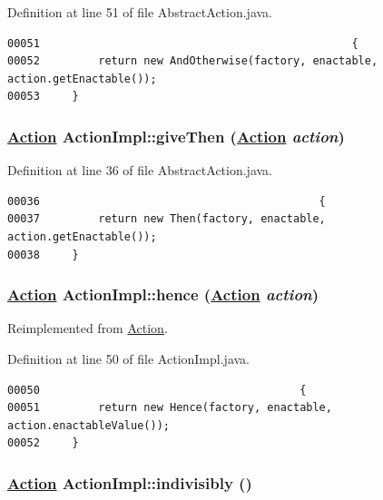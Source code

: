 Definition at line 51 of file Abstract\-Action.java.\footnotesize\begin{verbatim}00051                                                {
00052         return new AndOtherwise(factory, enactable, action.getEnactable());
00053     }
\end{verbatim}\normalsize 
\hypertarget{classActionImpl_a2}{
\subsubsection[giveThen]{\setlength{\rightskip}{0pt plus 5cm}\hyperlink{interfaceAction}{Action} Action\-Impl::give\-Then (\hyperlink{interfaceAction}{Action} {\em action})}}
\label{classActionImpl_a2}




Definition at line 36 of file Abstract\-Action.java.\footnotesize\begin{verbatim}00036                                           {
00037         return new Then(factory, enactable, action.getEnactable());
00038     }
\end{verbatim}\normalsize 
\hypertarget{classActionImpl_a18}{
\subsubsection[hence]{\setlength{\rightskip}{0pt plus 5cm}\hyperlink{interfaceAction}{Action} Action\-Impl::hence (\hyperlink{interfaceAction}{Action} {\em action})}}
\label{classActionImpl_a18}




Reimplemented from \hyperlink{interfaceAction_a8}{Action}.

Definition at line 50 of file Action\-Impl.java.\footnotesize\begin{verbatim}00050                                        {
00051         return new Hence(factory, enactable, action.enactableValue());
00052     }
\end{verbatim}\normalsize 
\hypertarget{classActionImpl_a19}{
\subsubsection[indivisibly]{\setlength{\rightskip}{0pt plus 5cm}\hyperlink{interfaceAction}{Action} Action\-Impl::indivisibly ()}}
\label{classActionImpl_a19}





